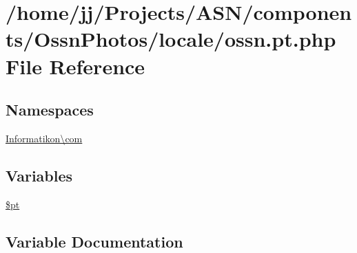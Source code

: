 \hypertarget{components_2_ossn_photos_2locale_2ossn_8pt_8php}{}\section{/home/jj/\+Projects/\+A\+S\+N/components/\+Ossn\+Photos/locale/ossn.pt.\+php File Reference}
\label{components_2_ossn_photos_2locale_2ossn_8pt_8php}
\subsection*{Namespaces}
\begin{DoxyCompactItemize}
\item 
 \hyperlink{namespace_informatikon_1_1com}{Informatikon\textbackslash{}com}
\end{DoxyCompactItemize}
\subsection*{Variables}
\begin{DoxyCompactItemize}
\item 
\hyperlink{components_2_ossn_photos_2locale_2ossn_8pt_8php_a62c150775a7a00e8663463c638016cad}{\$pt}
\end{DoxyCompactItemize}


\subsection{Variable Documentation}
